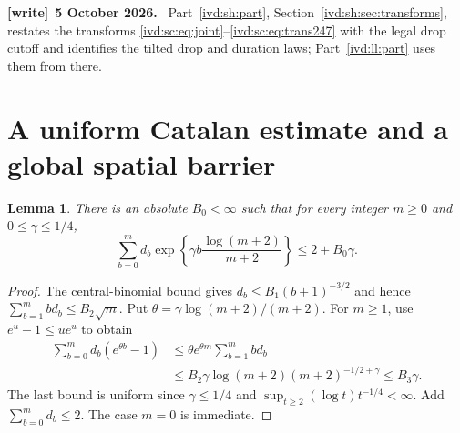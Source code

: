 \documentclass[11pt,letterpaper]{article}
\newtheorem{lemma}[theorem]{Lemma}
\theoremstyle{remark}\newtheorem{remark}[theorem]{Remark}
\numberwithin{equation}{section}
\newenvironment{writenote}[1][]{\par\smallskip\begingroup\small
 \noindent\textbf{[write]}\if\relax\detokenize{#1}\relax\else~\textbf{#1.}\fi\ }%
 {\par\endgroup\smallskip}
\begin{document}
\begin{writenote}[5 October 2026]
Part~\ref{ivd:sh:part}, Section~\ref{ivd:sh:sec:transforms}, restates the transforms \eqref{ivd:sc:eq:joint}--\eqref{ivd:sc:eq:trans247} with the legal drop cutoff and identifies the tilted drop and duration laws; Part~\ref{ivd:ll:part} uses them from there.
\end{writenote}

\section{A uniform Catalan estimate and a global spatial barrier}\label{ivd:sc:sec:barrier}
\begin{lemma}\label{ivd:sc:lem:catalan}
There is an absolute $B_0<\infty$ such that for every integer $m\ge0$
and $0\le\gamma\le1/4$,
\begin{equation}\label{ivd:sc:eq:catalan}
 \sum_{b=0}^m d_b\exp\left\{\gamma b\frac{\log(m+2)}{m+2}\right\}
 \le2+B_0\gamma.
\end{equation}
\end{lemma}
\begin{proof}
The central-binomial bound gives $d_b\le B_1(b+1)^{-3/2}$ and hence
$\sum_{b=1}^m b d_b\le B_2\sqrt m$. Put
$\theta=\gamma\log(m+2)/(m+2)$. For $m\ge1$, use
$e^u-1\le ue^u$ to obtain
\begin{align*}
 \sum_{b=0}^m d_b(e^{\theta b}-1)
 &\le\theta e^{\theta m}\sum_{b=1}^m b d_b\\
 &\le B_2\gamma\log(m+2)(m+2)^{-1/2+\gamma}
 \le B_3\gamma.
\end{align*}
The last bound is uniform since $\gamma\le1/4$ and
$\sup_{t\ge2}(\log t)t^{-1/4}<\infty$. Add
$\sum_{b=0}^m d_b\le2$. The case $m=0$ is immediate.
\end{proof}
\end{document}
